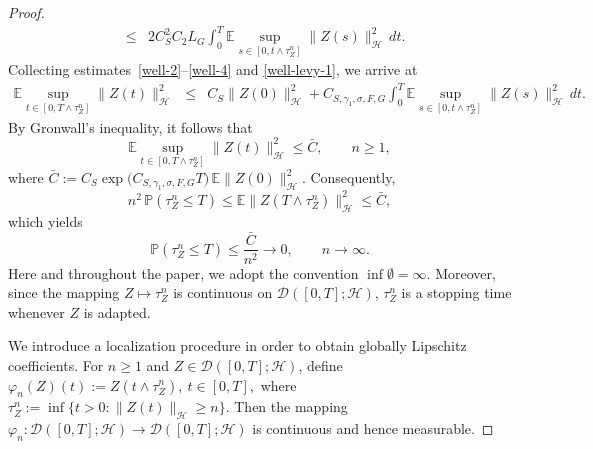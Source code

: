 \documentclass[11pt]{article}
\theoremstyle{plain}
\numberwithin{equation}{section}
\begin{document}
\begin{proof}
\begin{eqnarray}
&\le& 2C_S^2 C_2 L_G\int_0^T\mathbb E\sup_{s\in[0,t\wedge\tau_Z^n]}\|Z(s)\|_{\mathcal H}^2\,dt .
\end{eqnarray}
Collecting estimates~\eqref{well-2}--\eqref{well-4} and \eqref{well-levy-1}, we arrive at
\begin{eqnarray}\label{well-gronwall}
\mathbb E\sup_{t\in[0,T\wedge\tau_Z^n]}\|Z(t)\|_{\mathcal H}^2
&\le&C_S\|Z(0)\|_{\mathcal H}^2+ C_{S,\gamma_1,\sigma,F,G}\int_0^T\mathbb E\sup_{s\in[0,t\wedge\tau_Z^n]}\|Z(s)\|_{\mathcal H}^2\,dt .
\end{eqnarray}
By Gronwall’s inequality, it follows that
\begin{equation}\label{well-02-}
\mathbb E\sup_{t\in[0,T\wedge\tau_Z^n]}\|Z(t)\|_{\mathcal H}^2\le \bar C,\qquad n\ge1,
\end{equation}
where
\(\bar C:= C_S \exp\!\big(C_{S,\gamma_1,\sigma,F,G}T\big)\,\mathbb E\|Z(0)\|_{\mathcal H}^2 .\) Consequently,
\[
n^2\,\mathbb P(\tau_Z^n\le T)\le \mathbb E\|Z(T\wedge\tau_Z^n)\|_{\mathcal H}^2 \le \bar C,
\]
which yields
\[
\mathbb P(\tau_Z^n\le T)\le \frac{\bar C}{n^2} \longrightarrow 0, \qquad n\to\infty .
\]
Here and throughout the paper, we adopt the convention $\inf\emptyset=\infty$.
Moreover, since the mapping $Z\mapsto\tau_Z^n$ is continuous on $\mathcal D([0,T];\mathcal H)$,
$\tau_Z^n$ is a stopping time whenever $Z$ is adapted.

We introduce a localization procedure in order to obtain globally Lipschitz
coefficients.
For $n\ge1$ and $Z\in\mathcal D([0,T];\mathcal H)$, define \(\varphi_n(Z)(t):=Z(t\wedge\tau_Z^n),~ t\in[0,T],\)
where $\tau_Z^n:=\inf\{t>0:\|Z(t)\|_{\mathcal H}\ge n\}$. Then the mapping $\varphi_n:\mathcal D([0,T];\mathcal H)\to
\mathcal D([0,T];\mathcal H)$ is continuous and hence measurable.


\end{proof}
\end{document}
